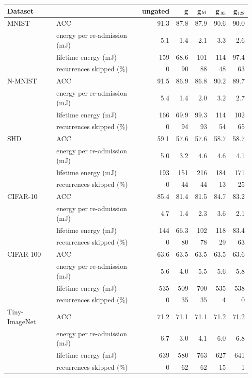 \begin{tabular*}{\textwidth}{@{\extracolsep{\fill}}llrrrrr@{}}
\toprule
Dataset & & ungated & g & g$_{\rm M}$ & g$_{.95}$ & g$_{128}$ \\
\midrule
MNIST & ACC & 91.3 & 87.8 & 87.9 & 90.6 & 90.0 \\
 & energy per re-admission (mJ) & 5.1 & 1.4 & 2.1 & 3.3 & 2.6 \\
 & lifetime energy (mJ) & 159 & 68.6 & 101 & 114 & 97.4 \\
 & recurrences skipped (\%) & 0 & 90 & 88 & 48 & 63 \\
N-MNIST & ACC & 91.5 & 86.9 & 86.8 & 90.2 & 89.7 \\
 & energy per re-admission (mJ) & 5.4 & 1.4 & 2.0 & 3.2 & 2.7 \\
 & lifetime energy (mJ) & 166 & 69.9 & 99.3 & 114 & 102 \\
 & recurrences skipped (\%) & 0 & 94 & 93 & 54 & 65 \\
SHD & ACC & 59.1 & 57.6 & 57.6 & 58.7 & 58.7 \\
 & energy per re-admission (mJ) & 5.0 & 3.2 & 4.6 & 4.6 & 4.1 \\
 & lifetime energy (mJ) & 193 & 151 & 216 & 184 & 171 \\
 & recurrences skipped (\%) & 0 & 44 & 44 & 13 & 25 \\
CIFAR-10 & ACC & 85.4 & 81.4 & 81.5 & 84.7 & 83.2 \\
 & energy per re-admission (mJ) & 4.7 & 1.4 & 2.3 & 3.6 & 2.1 \\
 & lifetime energy (mJ) & 144 & 66.3 & 102 & 118 & 83.4 \\
 & recurrences skipped (\%) & 0 & 80 & 78 & 29 & 63 \\
CIFAR-100 & ACC & 63.6 & 63.5 & 63.5 & 63.5 & 63.6 \\
 & energy per re-admission (mJ) & 5.6 & 4.0 & 5.5 & 5.6 & 5.8 \\
 & lifetime energy (mJ) & 535 & 509 & 700 & 535 & 538 \\
 & recurrences skipped (\%) & 0 & 35 & 35 & 4 & 0 \\
Tiny-ImageNet & ACC & 71.2 & 71.1 & 71.1 & 71.2 & 71.2 \\
 & energy per re-admission (mJ) & 6.7 & 3.0 & 4.1 & 6.0 & 6.8 \\
 & lifetime energy (mJ) & 639 & 580 & 763 & 627 & 641 \\
 & recurrences skipped (\%) & 0 & 62 & 62 & 15 & 1 \\
\bottomrule
\end{tabular*}
